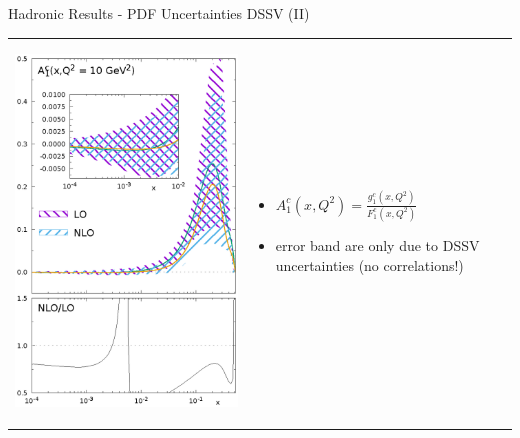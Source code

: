 \begin{frame}{Hadronic Results - PDF Uncertainties DSSV (II)}
\begin{tabular}{wn}
\begin{center}
\includegraphics[height=.97\textheight]{img/A1-pdf}
\end{center} & 
\begin{itemize}
\item $A_1^c(x,Q^2) = \frac{g_1^c(x,Q^2)}{F_1^c(x,Q^2)}$
\item error band are only due to DSSV uncertainties (no correlations!)
\end{itemize}
\end{tabular}
\end{frame}
